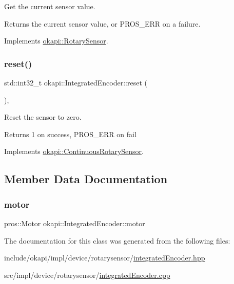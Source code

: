 Get the current sensor value.

\begin{DoxyReturn}{Returns}
the current sensor value, or {\ttfamily P\+R\+O\+S\+\_\+\+E\+RR} on a failure. 
\end{DoxyReturn}


Implements \mbox{\hyperlink{classokapi_1_1RotarySensor_ac5534dc6c3bcbd8ea2f4e54a04cda734}{okapi\+::\+Rotary\+Sensor}}.

\mbox{\label{classokapi_1_1IntegratedEncoder_a1f95f00f59911a87a9a38633343f4311}} 
\subsubsection{\texorpdfstring{reset()}{reset()}}
{\footnotesize\ttfamily std\+::int32\+\_\+t okapi\+::\+Integrated\+Encoder\+::reset (\begin{DoxyParamCaption}{ }\end{DoxyParamCaption})\hspace{0.3cm}{\ttfamily [override]}, {\ttfamily [virtual]}}

Reset the sensor to zero.

\begin{DoxyReturn}{Returns}
1 on success, P\+R\+O\+S\+\_\+\+E\+RR on fail 
\end{DoxyReturn}


Implements \mbox{\hyperlink{classokapi_1_1ContinuousRotarySensor_ae7268b0603097ac2d93a67e4fefa43e0}{okapi\+::\+Continuous\+Rotary\+Sensor}}.



\subsection{Member Data Documentation}
\mbox{\label{classokapi_1_1IntegratedEncoder_a2610609752fafa3cf548b328e15e15db}} 
\subsubsection{\texorpdfstring{motor}{motor}}
{\footnotesize\ttfamily pros\+::\+Motor okapi\+::\+Integrated\+Encoder\+::motor\hspace{0.3cm}{\ttfamily [protected]}}



The documentation for this class was generated from the following files\+:\begin{DoxyCompactItemize}
\item 
include/okapi/impl/device/rotarysensor/\mbox{\hyperlink{integratedEncoder_8hpp}{integrated\+Encoder.\+hpp}}\item 
src/impl/device/rotarysensor/\mbox{\hyperlink{integratedEncoder_8cpp}{integrated\+Encoder.\+cpp}}\end{DoxyCompactItemize}
